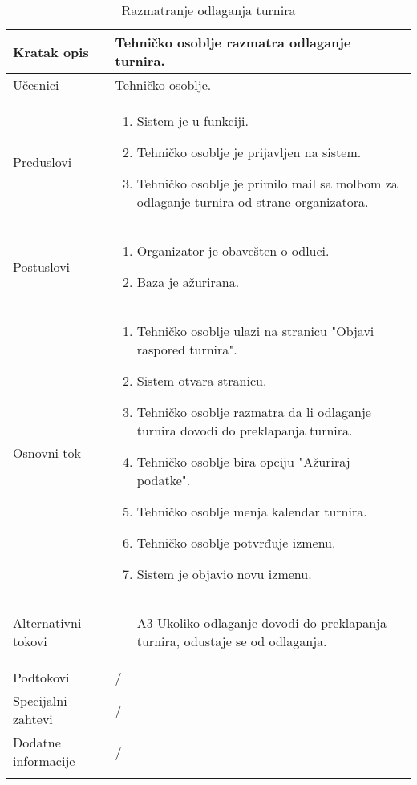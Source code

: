 \documentclass{article}
\begin{document}
 \begin{longtable}{| p{} | p{} |} 
            \hline
                Kratak opis & Tehničko osoblje razmatra odlaganje turnira. \\ 
            \hline    
                Učesnici & Tehničko osoblje.\\
            \hline
               Preduslovi & \begin{enumerate}
                   \item Sistem je u funkciji.
                   \item Tehničko osoblje je prijavljen na sistem. 
                   \item Tehničko osoblje je primilo mail sa molbom za odlaganje turnira od strane organizatora.
                \end{enumerate}\\
            \hline  
                Postuslovi & \begin{enumerate}
                   \item Organizator je obavešten o odluci.
                   \item Baza je ažurirana. 
                \end{enumerate}\\
            \hline
                Osnovni tok & \begin{enumerate}
                    \item Tehničko osoblje ulazi na stranicu "Objavi raspored turnira".
                    \item Sistem otvara stranicu.
                    \item Tehničko osoblje razmatra da li odlaganje turnira dovodi do preklapanja turnira.
                    \item Tehničko osoblje bira opciju "Ažuriraj podatke".
                    \item Tehničko osoblje menja kalendar turnira.
                    \item Tehničko osoblje potvrđuje izmenu.
                    \item Sistem je objavio novu izmenu.
                \end{enumerate}\\
            \hline
                Alternativni tokovi & 
                \begin{itemize}
                    \item[A3] Ukoliko odlaganje dovodi do preklapanja turnira, odustaje se od odlaganja.
                \end{itemize}\\
            \hline
                Podtokovi & /\\
            \hline
                Specijalni zahtevi & /\\
            \hline
                Dodatne informacije & /\\
            \hline
            \caption{Razmatranje odlaganja turnira}
        \end{longtable}
\end{document}
